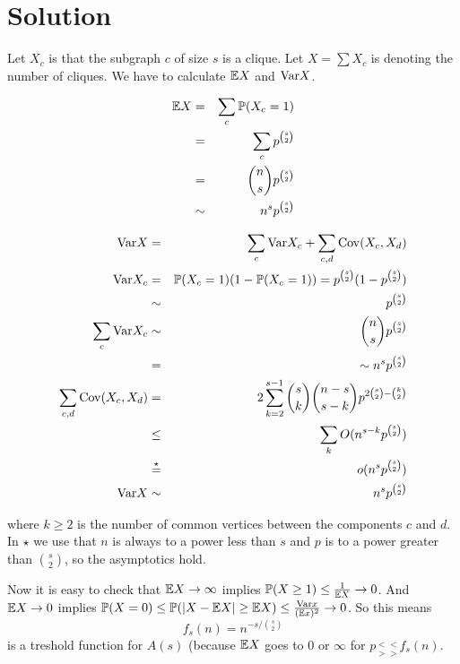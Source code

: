 \documentclass[a4paper]{article}
\begin{document}
\section{Solution}

Let $ X_c $ is \irv that the subgraph $ c $ of size $ s $ is a clique.
Let $ X = \sum X_c $ is \rv denoting the number of cliques.
We have to calculate $ \mathbb{E} X $ and $ \mathrm{Var} X $.

\begin{eqnarray*}
  \mathbb{E} X &=& \sum_{c} \mathbb{P}(X_c = 1) \\
    &=& \sum_{c} p^{\binom{s}{2}} \\
    &=& \binom{n}{s} p^{\binom{s}{2}} \\
    &\sim& n^s p^{\binom{s}{2}}
\end{eqnarray*}

\begin{eqnarray*}
  \mathrm{Var} X &=& \sum_{c} \mathrm{Var} X_c + \sum_{c,d} \mathrm{Cov}(X_c, X_d) \\
  \mathrm{Var} X_c &=& \mathbb{P}(X_c = 1)(1 - \mathbb{P}(X_c = 1)) = p^{\binom{s}{2}}(1 - p^{\binom{s}{2}}) \\
    &\sim& p^{\binom{s}{2}} \\
  \sum_c \mathrm{Var} X_c &\sim& \binom{n}{s} p^{\binom{s}{2}} \\
    &=& \sim n^s p^{\binom{s}{2}} \\
  \sum_{c,d} \mathrm{Cov}(X_c, X_d) &=& 2 \sum_{k=2}^{s-1} \binom{s}{k} \binom{n-s}{s-k} p^{2\binom{s}{2} - \binom{k}{2}} \\
    &\le& \sum_k O(n^{s-k} p^{\binom{s}{2}}) \\
    &\overset{\star}{=}& o(n^s p^{\binom{s}{2}}) \\
  \mathrm{Var} X &\sim& n^s p^{\binom{s}{2}} \\
\end{eqnarray*}

where $ k \ge 2 $ is the number of common vertices between the components
$ c $ and $ d $. In $ \star $ we use that $ n $ is always to a power less than
$ s $ and $ p $ is to a power greater than $ \binom{s}{2} $, so the asymptotics
hold.

Now it is easy to check that $ \mathbb{E} X \to \infty $ implies $ \mathbb{P}(X \ge 1) \le \frac{1}{\mathbb{E} X} \to 0 $.
And $ \mathbb{E} X \to 0 $ implies $ \mathbb{P}(X = 0) \le \mathbb{P}( | X - \mathbb{E} X | \ge \mathbb{E} X) \le \frac{\mathrm{Var} x}{(\mathbb{E} x)^2} \to 0 $.
So this means $$ f_s(n) = n^{{-s}/{\binom{s}{2}}} $$ is a treshold function for $ A(s) $ (because $ \mathbb{E} X $ goes to $ 0 $ or $ \infty $ for $ p \overset{<<}{\underset{>>}{}} f_s(n) $. \endproof
\end{document}
